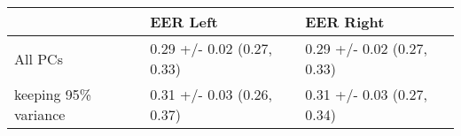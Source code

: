 \begin{tabular}{lll}
\toprule
{} &                    EER Left &                   EER Right \\
\midrule
All PCs              &  0.29 +/- 0.02 (0.27, 0.33) &  0.29 +/- 0.02 (0.27, 0.33) \\
keeping 95\% variance &  0.31 +/- 0.03 (0.26, 0.37) &  0.31 +/- 0.03 (0.27, 0.34) \\
\bottomrule
\end{tabular}
